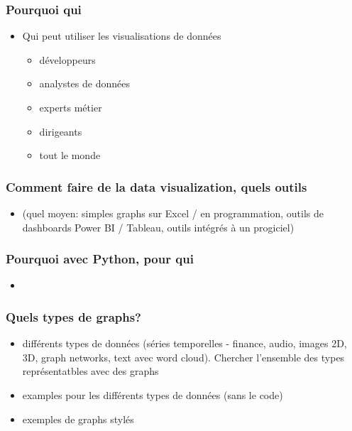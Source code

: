 \begin{frame}\frametitle{Pourquoi qui}
   \begin{itemize}
      \item Qui peut utiliser les visualisations de données
      \begin{itemize}
         \item développeurs
         \item analystes de données
         \item experts métier
         \item dirigeants
         \item tout le monde
      \end{itemize}
   \end{itemize}
\end{frame}

\begin{frame}\frametitle{Comment faire de la data visualization, quels outils}
   \begin{itemize}
      \item (quel moyen: simples graphs sur Excel / en programmation, outils de dashboards Power BI / Tableau, outils intégrés à un progiciel)
   \end{itemize}
\end{frame}

\begin{frame}\frametitle{Pourquoi avec Python, pour qui}
   \begin{itemize}
      \item 
   \end{itemize}
\end{frame}

\begin{frame}\frametitle{Quels types de graphs?}
   \begin{itemize}
      \item différents types de données (séries temporelles - finance, audio, images 2D, 3D, graph networks, text avec word cloud). Chercher l'ensemble des types représentatbles avec des graphs
      \item examples pour les différents types de données (sans le code)
      \item exemples de graphs stylés
   \end{itemize}
\end{frame}



